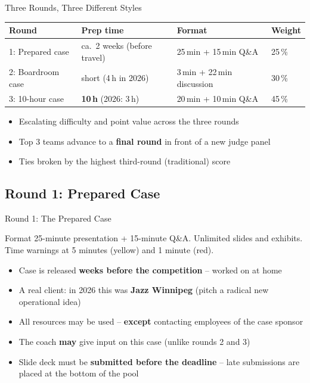 \documentclass[aspectratio=169,11pt]{beamer}
\begin{document}
\begin{frame}{Three Rounds, Three Different Styles}
  \begin{center}
    \begin{tabular}{llll}
      \toprule
      \textbf{Round} & \textbf{Prep time} & \textbf{Format} & \textbf{Weight} \\
      \midrule
      1: Prepared case    & ca.\ 2 weeks (before travel) & 25\,min + 15\,min Q\&A & 25\,\% \\
      2: Boardroom case   & short (4\,h in 2026)         & 3\,min + 22\,min discussion & 30\,\% \\
      3: 10-hour case & \textbf{10\,h} (2026: 3\,h)         & 20\,min + 10\,min Q\&A & 45\,\% \\
      \bottomrule
    \end{tabular}
  \end{center}
  \begin{itemize}
    \item Escalating difficulty and point value across the three rounds
    \item Top 3 teams advance to a \textbf{final round} in front of a new judge panel
    \item Ties broken by the highest third-round (traditional) score
  \end{itemize}
\end{frame}

\subsection{Round 1: Prepared Case}

\begin{frame}{Round 1: The Prepared Case}
  \begin{block}{Format}
    25-minute presentation + 15-minute Q\&A. Unlimited slides and exhibits. Time warnings at 5 minutes (yellow) and 1 minute (red).
  \end{block}
  \begin{itemize}
    \item Case is released \textbf{weeks before the competition} -- worked on at home
    \item A real client: in 2026 this was \textbf{Jazz Winnipeg} (pitch a radical new operational idea)
    \item All resources may be used -- \textbf{except} contacting employees of the case sponsor
    \item The coach \textbf{may} give input on this case (unlike rounds 2 and 3)
    \item Slide deck must be \textbf{submitted before the deadline} -- late submissions are placed at the bottom of the pool
  \end{itemize}
\end{frame}
\end{document}
